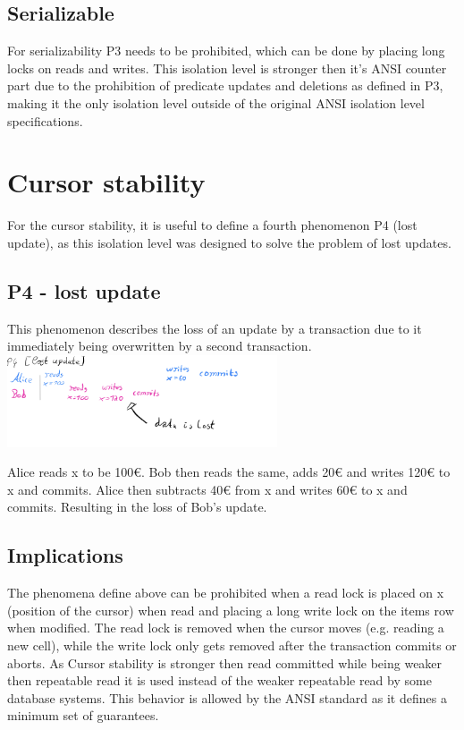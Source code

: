 \documentclass[sigconf, review=true]{acmart}
\begin{document}
\subsection{Serializable}
For serializability P3 needs to be prohibited, which can be done by placing long locks
on reads and writes. This isolation level is stronger then it's ANSI counter part due to the
prohibition of predicate updates and deletions as defined in P3, making it the only isolation level
outside of the original ANSI isolation level specifications.

\section{Cursor stability}
For the cursor stability, it is useful to define a fourth phenomenon P4 (lost update), as this isolation level
was designed to solve the problem of lost updates.
\subsection{ P4 - lost update}
This phenomenon describes the loss of an update by a transaction due to it immediately being overwritten
by a second transaction.
\includegraphics[width=8cm]{P4}
\begin{example}
    Alice reads x to be 100€. Bob then reads the same, adds 20€ and writes 120€ to x and commits.
    Alice then subtracts 40€ from x and writes 60€ to x and commits. Resulting in the loss of Bob's update.
    \subsection{Implications}
    The phenomena define above can be prohibited when a read lock is placed on x (position of the cursor) when
    read and placing a long write lock on the items row when modified.
    The read lock is removed when the cursor moves (e.g. reading a new cell),
    while the write lock only gets removed after the transaction commits or aborts.
    As Cursor stability is stronger then read committed while being weaker then repeatable read it
    is used instead of the weaker repeatable read by some database systems. This behavior is allowed by the ANSI standard
    as it defines a minimum set of guarantees.
\end{example}
\end{document}
